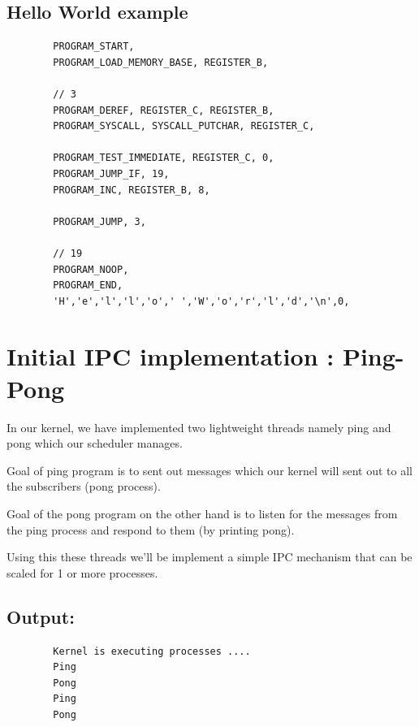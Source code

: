 \documentclass[12pt]{report}
\begin{document}
    \pagebreak
    
    \section{Hello World example}
    \begin{verbatim}
        PROGRAM_START,
        PROGRAM_LOAD_MEMORY_BASE, REGISTER_B,

        // 3
        PROGRAM_DEREF, REGISTER_C, REGISTER_B,
        PROGRAM_SYSCALL, SYSCALL_PUTCHAR, REGISTER_C,
        
        PROGRAM_TEST_IMMEDIATE, REGISTER_C, 0,
        PROGRAM_JUMP_IF, 19,
        PROGRAM_INC, REGISTER_B, 8,

        PROGRAM_JUMP, 3,

        // 19
        PROGRAM_NOOP,
        PROGRAM_END,
        'H','e','l','l','o',' ','W','o','r','l','d','\n',0,
    \end{verbatim}

    \chapter{Initial IPC implementation : Ping-Pong}
    In our kernel, we have implemented two lightweight threads namely ping and pong 
    which our scheduler manages.

    Goal of ping program is to sent out messages which our kernel will sent out to all the subscribers (pong process).

    Goal of the pong program on the other hand is to listen for the messages from the ping process and respond to them (by printing pong).

    Using this these threads we’ll be implement a simple IPC mechanism that can be scaled for 1 or more processes.

    \section{Output:}
    \begin{verbatim}
        Kernel is executing processes ....
        Ping
        Pong
        Ping
        Pong
    \end{verbatim}
\end{document}
